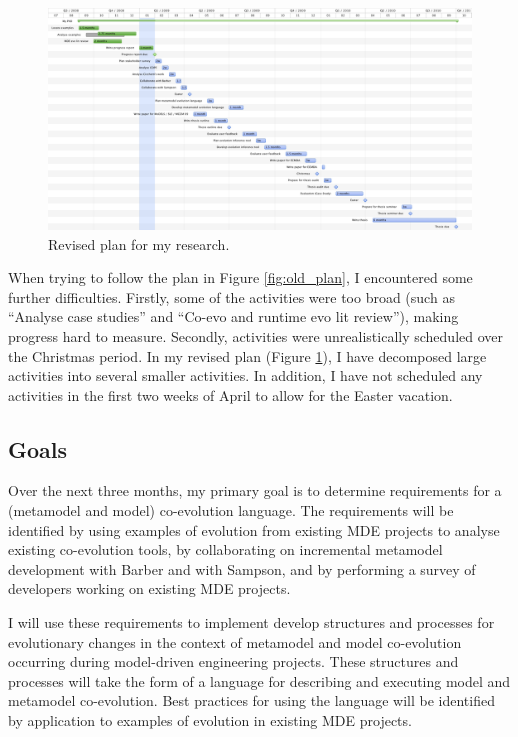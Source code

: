 \newpage
\begin{landscape}

\begin{figure}[ht]
  \begin{center}
    \leavevmode
    \includegraphics[scale=0.4]{revised_plan.png}
  \end{center}
  \caption{Revised plan for my research.}
  \label{fig:revised_plan}
\end{figure}

\end{landscape}

When trying to follow the plan in Figure \ref{fig:old_plan}, I encountered some further difficulties. Firstly, some of the activities were too broad (such as ``Analyse case studies'' and ``Co-evo and runtime evo lit review''), making progress hard to measure. Secondly, activities were unrealistically scheduled over the Christmas period.  In my revised plan (Figure \ref{fig:revised_plan}), I have decomposed large activities into several smaller activities. In addition, I have not scheduled any activities in the first two weeks of April to allow for the Easter vacation.


\subsection{Goals} %
\label{sub:goals}
Over the next three months, my primary goal is to determine requirements for a (metamodel and model) co-evolution language. The requirements will be identified by using examples of evolution from existing MDE projects to analyse existing co-evolution tools, by collaborating on incremental metamodel development with Barber and with Sampson, and by performing a survey of developers working on existing MDE projects.

I will use these requirements to implement develop structures and processes for evolutionary changes in the context of metamodel and model co-evolution occurring during model-driven engineering projects. These structures and processes will take the form of a language for describing and executing model and metamodel co-evolution. Best practices for using the language will be identified by application to examples of evolution in existing MDE projects.

